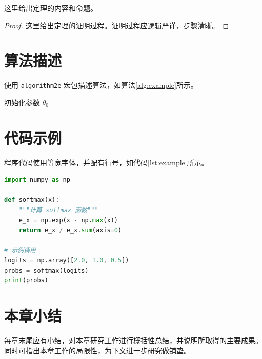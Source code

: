 \begin{theorem}[定理名称]
    这里给出定理的内容和命题。
\end{theorem}

\begin{proof}
    这里给出定理的证明过程。证明过程应逻辑严谨，步骤清晰。
\end{proof}

\section{算法描述}

使用 \texttt{algorithm2e} 宏包描述算法，如算法\ref{alg:example}所示。

\begin{algorithm}[H]
    \caption{示例算法}
    \label{alg:example}
    初始化参数 $\theta_0$\;
\end{algorithm}

\section{代码示例}

程序代码使用等宽字体，并配有行号，如代码\ref{lst:example}所示。

\begin{lstlisting}[language=Python, caption={Python 代码示例}, label={lst:example}]
import numpy as np

def softmax(x):
    """计算 softmax 函数"""
    e_x = np.exp(x - np.max(x))
    return e_x / e_x.sum(axis=0)

# 示例调用
logits = np.array([2.0, 1.0, 0.5])
probs = softmax(logits)
print(probs)
\end{lstlisting}

\section{本章小结}

每章末尾应有小结，对本章研究工作进行概括性总结，并说明所取得的主要成果。同时可指出本章工作的局限性，为下文进一步研究做铺垫。
